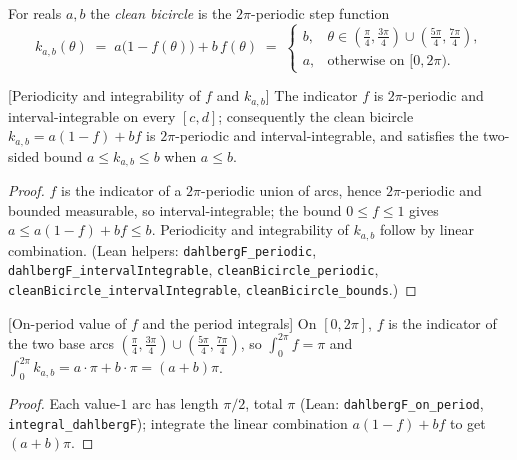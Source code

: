 \begin{definition}

  \label{def:clean_bicircle}
  For reals $a,b$ the \emph{clean bicircle} is the $2\pi$-periodic step function
  \[
    k_{a,b}(\theta) \;=\; a\bigl(1-f(\theta)\bigr) + b\,f(\theta)
      \;=\;
    \begin{cases}
      b, & \theta\in(\tfrac{\pi}{4},\tfrac{3\pi}{4})\cup(\tfrac{5\pi}{4},\tfrac{7\pi}{4}),\\
      a, & \text{otherwise on }[0,2\pi).
    \end{cases}
  \]
\end{definition}

\begin{lemma}

[Periodicity and integrability of $f$ and $k_{a,b}$]
  \label{lem:clean_bicircle_basic}
  The indicator $f$ is $2\pi$-periodic and interval-integrable on every $[c,d]$;
  consequently the clean bicircle $k_{a,b}=a(1-f)+bf$ is $2\pi$-periodic and
  interval-integrable, and satisfies the two-sided bound $a\le k_{a,b}\le b$ when
  $a\le b$.
\end{lemma}
\begin{proof}
  $f$ is the indicator of a $2\pi$-periodic union of arcs, hence $2\pi$-periodic and
  bounded measurable, so interval-integrable; the bound $0\le f\le 1$ gives
  $a\le a(1-f)+bf\le b$. Periodicity and integrability of $k_{a,b}$ follow by linear
  combination. (Lean helpers: \texttt{dahlbergF\_periodic},
  \texttt{dahlbergF\_intervalIntegrable}, \texttt{cleanBicircle\_periodic},
  \texttt{cleanBicircle\_intervalIntegrable}, \texttt{cleanBicircle\_bounds}.)
\end{proof}

\begin{lemma}

[On-period value of $f$ and the period integrals]
  \label{lem:clean_bicircle_integral}
  On $[0,2\pi]$, $f$ is the indicator of the two base arcs
  $(\tfrac{\pi}{4},\tfrac{3\pi}{4})\cup(\tfrac{5\pi}{4},\tfrac{7\pi}{4})$, so
  $\int_0^{2\pi}f=\pi$ and $\int_0^{2\pi}k_{a,b}=a\!\cdot\!\pi+b\!\cdot\!\pi=(a+b)\pi$.
\end{lemma}
\begin{proof}
  Each value-$1$ arc has length $\pi/2$, total $\pi$ (Lean:
  \texttt{dahlbergF\_on\_period}, \texttt{integral\_dahlbergF}); integrate the linear
  combination $a(1-f)+bf$ to get $(a+b)\pi$.
\end{proof}


